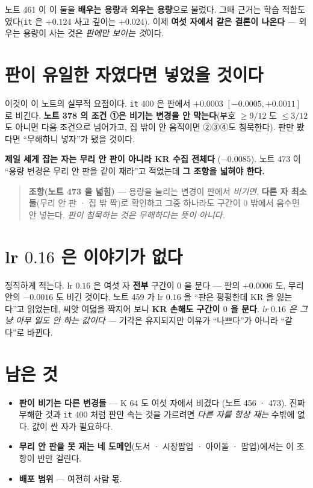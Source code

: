 \documentclass[11pt]{article}
\begin{document}
노트 461 이 이 둘을 \textbf{배우는 용량}과 \textbf{외우는 용량}으로
불렀다. 그때 근거는 학습 적합도였다(\texttt{it} 은 $+0.124$ 사고
깊이는 $+0.024$). 이제 \textbf{여섯 자에서 같은 결론이 나온다} --- 외우는
용량이 사는 것은 \emph{판에만 보이는 것}이다.

\section{판이 유일한 자였다면 넣었을 것이다}

이것이 이 노트의 실무적 요점이다. \texttt{it} $400$ 은 판에서
$+0.0003$ $[-0.0005,+0.0011]$ 로 비긴다. \textbf{노트 378 의 조건 ①은
비기는 변경을 안 막는다}(부호 $\ge 9/12$ 도 $\le 3/12$ 도 아니면 다음
조건으로 넘어가고, 집 밖이 안 움직이면 ②③④도 침묵한다). 판만 봤다면
``무해하니 넣자''가 됐을 것이다.

\textbf{제일 세게 잡는 자는 무리 안 판이 아니라 KR 수집 전체다}
($-0.0085$). 노트 473 이 ``용량 변경은 무리 안 판을 같이 재라''고 적었는데
\textbf{그 조항을 넓혀야 한다.}

\begin{quote}
\textbf{조항(노트 473 을 넓힘)} --- 용량을 늘리는 변경이 판에서
\emph{비기면}, \textbf{다른 자 최소 둘}(무리 안 판 · 집 밖 짝)로 확인하고
그중 하나라도 구간이 $0$ 밖에서 음수면 안 넣는다. \emph{판이 침묵하는
것은 무해하다는 뜻이 아니다.}
\end{quote}

\section{lr $0.16$ 은 이야기가 없다}

정직하게 적는다. lr $0.16$ 은 여섯 자 \textbf{전부} 구간이 $0$ 을 문다
--- 판의 $+0.0006$ 도, 무리 안의 $-0.0016$ 도 비긴 것이다. 노트 459 가
lr $0.16$ 을 ``판은 평평한데 KR 을 잃는다''고 읽었는데, 씨앗 여덟을
짝지어 보니 \textbf{KR 손해도 구간이 $0$ 을 문다}. \emph{lr $0.16$ 은
그냥 아무 일도 안 하는 값이다} --- 기각은 유지되지만 이유가 ``나쁘다''가
아니라 ``같다''로 바뀐다.

\section*{남은 것}

\begin{itemize}
\item \textbf{판이 비기는 다른 변경들} --- K $64$ 도 여섯 자에서 비겼다
(노트 456 · 473). 진짜 무해한 것과 \texttt{it} $400$ 처럼 판만 속는 것을
가르려면 \emph{다른 자를 항상 재는} 수밖에 없다. 값이 싼 자가 필요하다.
\item \textbf{무리 안 판을 못 재는 네 도메인}(도서 · 시장팝업 · 아이돌 ·
팝업)에서는 이 조항이 반만 걸린다.
\item \textbf{배포 범위} --- 여전히 사람 몫.
\end{itemize}
\end{document}
